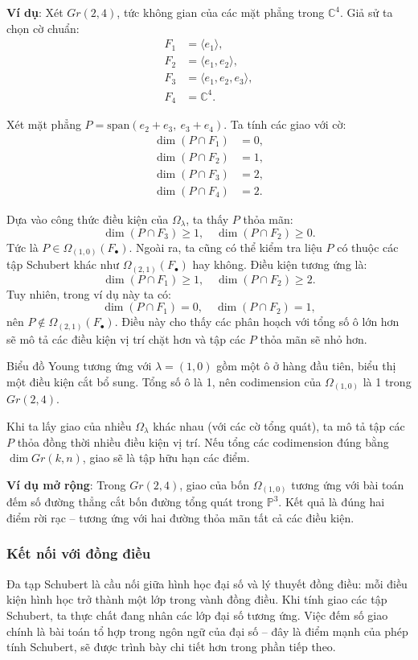 \textbf{Ví dụ}: Xét $Gr(2,4)$, tức không gian của các mặt phẳng trong $\mathbb{C}^4$. Giả sử ta chọn cờ chuẩn:
\begin{align*}
F_1 &= \langle e_1 \rangle, \\
F_2 &= \langle e_1, e_2 \rangle, \\
F_3 &= \langle e_1, e_2, e_3 \rangle, \\
F_4 &= \mathbb{C}^4.
\end{align*}

Xét mặt phẳng $P = \text{span}(e_2 + e_3,\ e_3 + e_4)$. Ta tính các giao với cờ:
\begin{align*}
\dim(P \cap F_1) &= 0, \\
\dim(P \cap F_2) &= 1, \\
\dim(P \cap F_3) &= 2, \\
\dim(P \cap F_4) &= 2.
\end{align*}

Dựa vào công thức điều kiện của $\Omega_\lambda$, ta thấy $P$ thỏa mãn:
\[ \dim(P \cap F_3) \geq 1, \quad \dim(P \cap F_2) \geq 0. \]
Tức là $P \in \Omega_{(1,0)}(F_\bullet)$. Ngoài ra, ta cũng có thể kiểm tra liệu $P$ có thuộc các tập Schubert khác như $\Omega_{(2,1)}(F_\bullet)$ hay không. Điều kiện tương ứng là:
\[ \dim(P \cap F_1) \geq 1, \quad \dim(P \cap F_2) \geq 2. \]
Tuy nhiên, trong ví dụ này ta có:
\[ \dim(P \cap F_1) = 0, \quad \dim(P \cap F_2) = 1, \]
nên $P \notin \Omega_{(2,1)}(F_\bullet)$. Điều này cho thấy các phân hoạch với tổng số ô lớn hơn sẽ mô tả các điều kiện vị trí chặt hơn và tập các $P$ thỏa mãn sẽ nhỏ hơn.


Biểu đồ Young tương ứng với $\lambda = (1,0)$ gồm một ô ở hàng đầu tiên, biểu thị một điều kiện cắt bổ sung. Tổng số ô là 1, nên codimension của $\Omega_{(1,0)}$ là 1 trong $Gr(2,4)$.

Khi ta lấy giao của nhiều $\Omega_\lambda$ khác nhau (với các cờ tổng quát), ta mô tả tập các $P$ thỏa đồng thời nhiều điều kiện vị trí. Nếu tổng các codimension đúng bằng $\dim Gr(k,n)$, giao sẽ là tập hữu hạn các điểm.

\textbf{Ví dụ mở rộng}: Trong $Gr(2,4)$, giao của bốn $\Omega_{(1,0)}$ tương ứng với bài toán đếm số đường thẳng cắt bốn đường tổng quát trong $\mathbb{P}^3$. Kết quả là đúng hai điểm rời rạc – tương ứng với hai đường thỏa mãn tất cả các điều kiện.

\subsubsection{\textbf{Kết nối với đồng điều}}
Đa tạp Schubert là cầu nối giữa hình học đại số và lý thuyết đồng điều: mỗi điều kiện hình học trở thành một lớp trong vành đồng điều. Khi tính giao các tập Schubert, ta thực chất đang nhân các lớp đại số tương ứng. Việc đếm số giao chính là bài toán tổ hợp trong ngôn ngữ của đại số – đây là điểm mạnh của phép tính Schubert, sẽ được trình bày chi tiết hơn trong phần tiếp theo.



